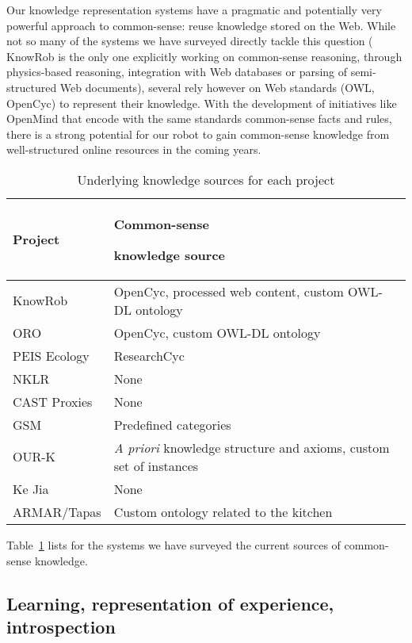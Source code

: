 \documentclass{IEEEtran}
\begin{document}
Our knowledge representation systems have a pragmatic and potentially very
powerful approach to common-sense: reuse knowledge stored on the Web. While not
so many of the systems we have surveyed directly tackle this question ({\sc
KnowRob} is the only one explicitly working on common-sense reasoning, through
physics-based reasoning, integration with Web databases or parsing of
semi-structured Web documents), several rely however on Web standards (OWL,
OpenCyc) to represent their knowledge. With the development of initiatives like
OpenMind that encode with the same standards common-sense facts and rules,
there is a strong potential for our robot to gain common-sense knowledge from
well-structured online resources in the coming years.

\begin{table}
\begin{center}

\begin{tabular}{lp{4cm}}
\toprule
{\bf Project} & {\bf Common-sense \par knowledge source} \\
\midrule
{\sc KnowRob} & {\sc OpenCyc}, processed web content, custom OWL-DL ontology \\
ORO & {\sc OpenCyc}, custom OWL-DL ontology \\
PEIS Ecology & {\sc ResearchCyc} \\
NKLR &  None \\
CAST Proxies &  None \\
GSM &  Predefined categories \\
OUR-K & {\it A priori} knowledge structure and axioms, custom set of instances\\
Ke Jia & None \\
ARMAR/{\sc Tapas} & Custom ontology related to the kitchen\\

\bottomrule

\end{tabular}
\end{center}
\caption{Underlying knowledge sources for each project}
\label{table|knowledge-sources}
\end{table}

Table~\ref{table|knowledge-sources} lists for the systems we have surveyed the
current sources of common-sense knowledge.

\subsection{Learning, representation of experience, introspection}
\end{document}
